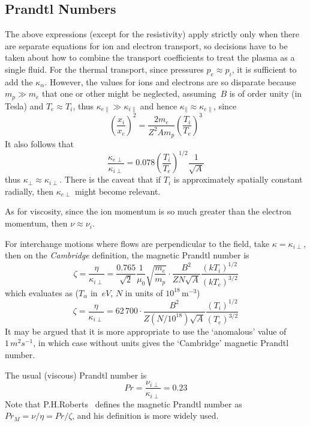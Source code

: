 
\subsection{Prandtl Numbers}\label{sec:prandtl}
The above expressions (except for the resistivity) apply strictly only when there
are separate equations for ion and electron transport, 
so decisions have to be taken about how to combine the transport coefficients
to treat the plasma as a single fluid. For the thermal transport, since 
pressures $p_e\approx p_i$, it is sufficient to add the $\kappa_\alpha$. However, the values for ions and electrons
are so disparate because $m_p\gg m_e$ that one or other might be neglected, 
assuming~$B$ is of order unity (in Tesla) and $T_e\approx T_i$, 
thus $\kappa_{e\|} \gg \kappa_{i\|}$ and hence 
$\kappa_{\|}\approx \kappa_{e\|}$, since 
\begin{equation}\label{eq:rbrat}
\left(\frac{x_i}{x_e}\right)^2 = \frac{2m_e}{Z^2 A m_p} \left(\frac{T_i}{T_e}\right)^3
\end{equation}
It also follows that
\begin{equation}\label{eq:krat}
\frac{\kappa_{e\perp}}{\kappa_{i\perp}} = 0.078 \left(\frac{T_i}{T_e}\right)^{1/2}
\frac{1}{\sqrt{A}}
\end{equation}
thus $\kappa_{\perp}\approx \kappa_{i\perp}$.
There is the caveat that if $T_i$ is approximately spatially constant radially,
then $\kappa_{e\perp}$ might become relevant.

As for viscosity, since the ion momentum is so much greater than the electron momentum, then $\nu\approx\nu_i$.

For interchange motions where flows are perpendicular to the field, take 
$\kappa=\kappa_{i\perp}$, then on the \emph{Cambridge} definition, the magnetic Prandtl number is
\begin{equation}\label{eq:zeta}
\zeta=\frac{\eta}{\kappa_{i\perp}}=\frac{0.765}{\sqrt{2}}\frac{1}{\mu_0}\sqrt{\frac{m_e}{m_p}} \cdot
\frac{B^2}{Z N\sqrt{A}} \frac{(kT_i)^{1/2}}{(kT_e)^{3/2}}
\end{equation}
which evaluates as ($T_\alpha$ in~$eV$, $N$ in units of $10^{18}$\,m$^{-3}$)
\begin{equation}\label{eq:zetan}
\zeta=\frac{\eta}{\kappa_{i\perp}}=62\,700 \cdot \frac{B^2}{Z (N/10^{18})\sqrt{A}} \frac{(T_i)^{1/2}}{(T_e)^{3/2}}
\end{equation}
It may be argued that it is more appropriate to use the `anomalous'  value of $1\,m^2 s^{-1}$,
in which case  without units gives the `Cambridge'  magnetic Prandtl number.

The usual (viscous) Prandtl number is
\begin{equation}\label{eq:sigma}
Pr=\frac{\nu_{i\perp}}{\kappa_{i\perp}}=0.23
\end{equation}
Note that P.H.Roberts~\cite{roberts} defines the magnetic Prandtl number
as $Pr_M=\nu/\eta=Pr/\zeta$, and his definition is more widely used.

